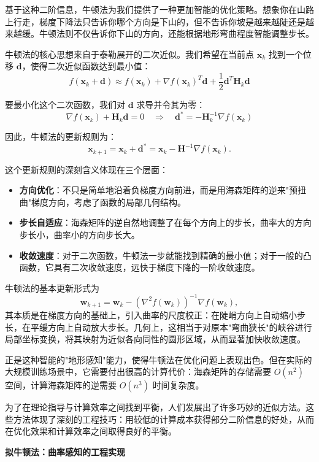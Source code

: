 基于这种二阶信息，牛顿法为我们提供了一种更加智能的优化策略。想象你在山路上行走，梯度下降法只告诉你哪个方向是下山的，但不告诉你坡是越来越陡还是越来越缓。牛顿法则不仅告诉你下山的方向，还能根据地形弯曲程度智能调整步长。

牛顿法的核心思想来自于泰勒展开的二次近似。我们希望在当前点 $\mathbf{x}_k$ 找到一个位移 $\mathbf{d}$，使得二次近似函数达到最小值：
$$
f(\mathbf{x}_k + \mathbf{d}) \approx f(\mathbf{x}_k) + \nabla f(\mathbf{x}_k)^T \mathbf{d} + \frac{1}{2}\mathbf{d}^T \mathbf{H}_k \mathbf{d}
$$

要最小化这个二次函数，我们对 $\mathbf{d}$ 求导并令其为零：
$$
\nabla f(\mathbf{x}_k) + \mathbf{H}_k \mathbf{d} = 0 \quad \Rightarrow \quad \mathbf{d}^* = -\mathbf{H}_k^{-1} \nabla f(\mathbf{x}_k)
$$

因此，牛顿法的更新规则为：
$$
\mathbf{x}_{k+1} = \mathbf{x}_k + \mathbf{d}^* = \mathbf{x}_k - \mathbf{H}^{-1} \nabla f(\mathbf{x}_k).
$$

这个更新规则的深刻含义体现在三个层面：
\begin{itemize}
    \item \textbf{方向优化}：不只是简单地沿着负梯度方向前进，而是用海森矩阵的逆来"预扭曲"梯度方向，考虑了函数的局部几何结构。
    \item \textbf{步长自适应}：海森矩阵的逆自然地调整了在每个方向上的步长，曲率大的方向步长小，曲率小的方向步长大。
    \item \textbf{收敛速度}：对于二次函数，牛顿法一步就能找到精确的最小值；对于一般的凸函数，它具有二次收敛速度，远快于梯度下降的一阶收敛速度。
\end{itemize}

牛顿法的基本更新形式为
$$
\mathbf{w}_{k+1} = \mathbf{w}_k - \left(\nabla^2 f(\mathbf{w}_k)\right)^{-1} \nabla f(\mathbf{w}_k),
$$
其本质是在梯度方向的基础上，引入曲率的尺度校正：在陡峭方向上自动缩小步长，在平缓方向上自动放大步长。几何上，这相当于对原本"弯曲狭长"的峡谷进行局部坐标变换，将其映射为近似各向同性的圆形区域，从而显著加快收敛速度。

正是这种智能的"地形感知"能力，使得牛顿法在优化问题上表现出色。但在实际的大规模训练场景中，它需要付出很高的计算代价：海森矩阵的存储需要 $O(n^2)$ 空间，计算海森矩阵的逆需要 $O(n^3)$ 时间复杂度。

为了在理论指导与计算效率之间找到平衡，人们发展出了许多巧妙的近似方法。这些方法体现了深刻的工程技巧：用较低的计算成本获得部分二阶信息的好处，从而在优化效果和计算效率之间取得良好的平衡。

\textbf{拟牛顿法：曲率感知的工程实现}


